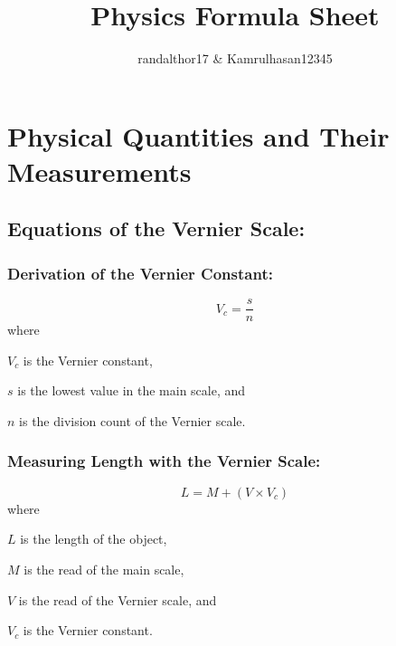 \documentclass[a4paper]{report}
\title{Physics Formula Sheet}
\author{randalthor17 \& Kamrulhasan12345}
\begin{document}
\maketitle
\tableofcontents
\chapter{Physical Quantities and Their Measurements}
    \section{Equations of the Vernier Scale: }
        \subsection{Derivation of the Vernier Constant: }
            \begin{equation}
                V_c = \frac{s}{n}
            \end{equation}
            where 
            \begin{description}
                \item $V_c$ is the Vernier constant,
                \item $s$ is the lowest value in the main scale, and
                \item $n$ is the division count of the Vernier scale.
            \end{description}
        \subsection{Measuring Length with the Vernier Scale: }
            \begin{equation}
                L = M + (V \times V_c)
            \end{equation}
            where
            \begin{description}
                \item $L$ is the length of the object,
                \item $M$ is the read of the main scale,
                \item $V$ is the read of the Vernier scale, and
                \item $V_c$ is the Vernier constant.
            \end{description}
\end{document}
